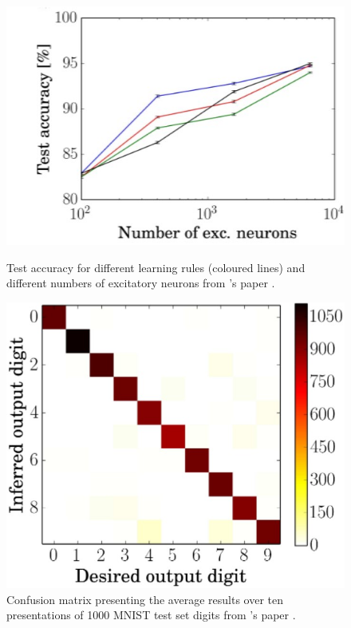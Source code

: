 \begin{figure}[http]
    \begin{minipage}[b]{.5\linewidth}
         \includegraphics[width=\linewidth]{pictures/num_exc_neurons_test_acc.jpg}
         \caption{Test accuracy for different learning rules (coloured lines) and different numbers of excitatory neurons from \authorsSNN{}'s paper \cite{SNN}.}
         \label{img:test_acc}
    \end{minipage}
    \hspace{0.06\linewidth}%
    \begin{minipage}[b]{.4\linewidth}
         \includegraphics[width=\linewidth]{pictures/error_analysis_confusion_matrix.jpg}
         \caption{Confusion matrix presenting the average results over ten presentations of 1000 MNIST test set digits from \authorsSNN{}'s paper \cite{SNN}.}
         \label{img:error_analysis}
    \end{minipage}
\end{figure}
